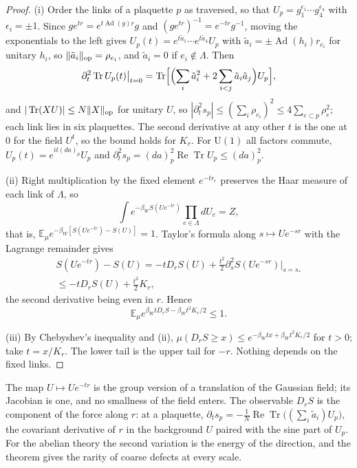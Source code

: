 \documentclass[11pt]{amsart}
\theoremstyle{definition}
\theoremstyle{remark}
\numberwithin{equation}{section}
\newcommand{\E}{\mathbb{E}}
\newcommand{\U}{\mathrm{U}}
\newcommand{\Tr}{\operatorname{Tr}}
\newcommand{\ReTr}{\operatorname{Re}\operatorname{Tr}}
\begin{document}
\begin{proof}
(i) Order the links of a plaquette $p$ as traversed, so that $U_p=g_1^{
\epsilon_1}\cdots g_4^{\epsilon_4}$ with $\epsilon_i=\pm1$. Since $ge^{tr}
=e^{t\operatorname{Ad}(g)r}g$ and $(ge^{tr})^{-1}=e^{-tr}g^{-1}$, moving
the exponentials to the left gives $U_p(t)=e^{t\tilde a_1}\cdots e^{t\tilde
a_4}U_p$ with $\tilde a_i=\pm\operatorname{Ad}(h_i)r_{e_i}$ for unitary
$h_i$, so $\|\tilde a_i\|_{\rm op}=\rho_{e_i}$, and $\tilde a_i=0$ if
$e_i\notin\Lambda$. Then
\[
\partial_t^2\Tr U_p(t)\big|_{t=0}=\Tr\Bigl[\Bigl(\sum_i\tilde a_i^2+2\sum_{
i<j}\tilde a_i\tilde a_j\Bigr)U_p\Bigr],
\]
and $|\Tr(XU)|\le N\|X\|_{\rm op}$ for unitary $U$, so $|\partial_t^2s_p|
\le(\sum_i\rho_{e_i})^2\le4\sum_{e\subset p}\rho_e^2$; each link lies in
six plaquettes. The second derivative at any other $t$ is the one at $0$
for the field $U^t$, so the bound holds for $K_r$. For $\U(1)$ all factors
commute, $U_p(t)=e^{it(da)_p}U_p$ and $\partial_t^2s_p=(da)_p^2\ReTr U_p
\le(da)_p^2$.

(ii) Right multiplication by the fixed element $e^{-tr_e}$ preserves the
Haar measure of each link of $\Lambda$, so
\[
\int e^{-\beta_WS(Ue^{-tr})}\prod_{e\in\Lambda}dU_e=Z,
\]
that is, $\E_\mu e^{-\beta_W[S(Ue^{-tr})-S(U)]}=1$.
Taylor's formula along $s\mapsto Ue^{-sr}$ with the Lagrange remainder
gives
\begin{multline*}
S(Ue^{-tr})-S(U)=-tD_rS(U)+\tfrac{t^2}2\partial_s^2S(Ue^{-sr})\big|_{s=s_*}\\
\le-tD_rS(U)+\tfrac{t^2}2K_r,
\end{multline*}
the second derivative being even in $r$. Hence
\[
\E_\mu e^{\beta_WtD_rS-\beta_Wt^2K_r/2}\le1.
\]

(iii) By Chebyshev's inequality and (ii), $\mu(D_rS\ge x)\le e^{-\beta_Wtx
+\beta_Wt^2K_r/2}$ for $t>0$; take $t=x/K_r$. The lower tail is the upper
tail for $-r$. Nothing depends on the fixed links.
\end{proof}

The map $U\mapsto Ue^{-tr}$ is the group version of a translation of the
Gaussian field; its Jacobian is one, and no smallness of the field enters.
The observable $D_rS$ is the component of the force along $r$: at a
plaquette, $\partial_ts_p=-\frac1N\ReTr\bigl((\sum_i\tilde a_i)U_p\bigr)$,
the covariant derivative of $r$ in the background $U$ paired with the
sine part of $U_p$. For the abelian theory the second variation is the
energy of the direction, and the theorem gives the rarity of coarse
defects at every scale.
\end{document}
